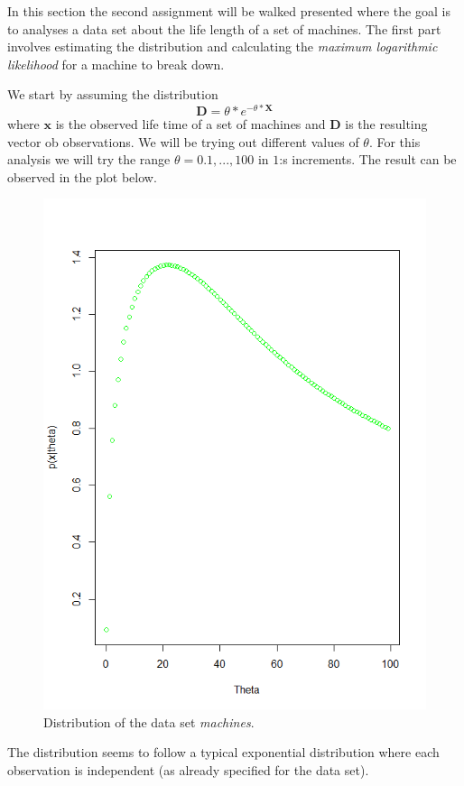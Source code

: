 \documentclass[a4paper,12pt]{article}
\begin{document}
In this section the second assignment will be walked presented where the goal is to analyses a data set about the life length of a set of machines. The first part involves estimating the distribution and calculating the \textit{maximum logarithmic likelihood} for a machine to break down. 

We start by assuming the distribution 
\begin{equation}
  \mathbf{D} = \theta * e^{-\theta * \mathbf{X}}
\end{equation}
where \(\mathbf{x}\) is the observed life time of a set of machines and \( \mathbf{D} \) is the resulting vector ob observations. We will be trying out different values of \(\theta\). For this analysis we will try the range \( \theta = 0.1,...,100\) in  \(1\):s increments. The result can be observed in the plot below.
\begin{figure}[H]
\centering
\begin{minipage}[]{0.5\textwidth}
  \includegraphics[width=\textwidth]{figures/Lab1_A2_data_distribution.png}  
  \caption{Distribution of the data set \textit{machines}.\label{fig:Distribution of the data set machines} }
 \end{minipage}
\end{figure}
The distribution seems to follow a typical exponential distribution where each observation is independent (as already specified for the data set).
\end{document}
